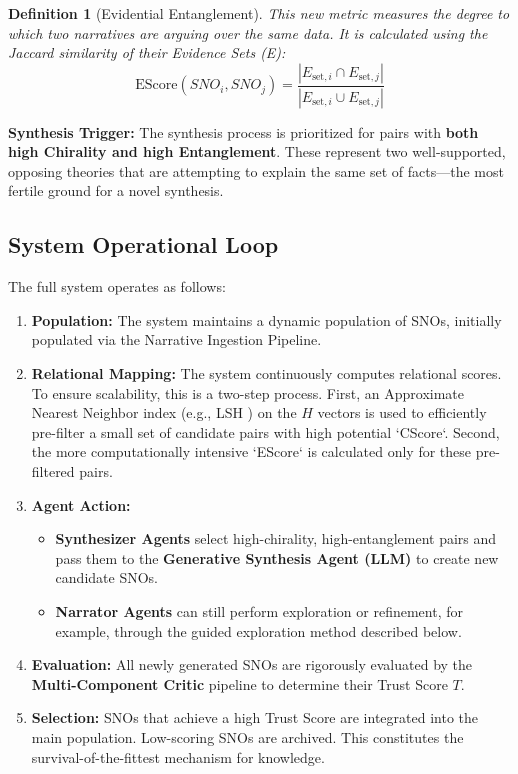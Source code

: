\documentclass[12pt, a4paper]{article}
\newtheorem{definition}{Definition}[section]
\begin{document}
\begin{definition}[Evidential Entanglement]
This new metric measures the degree to which two narratives are arguing over the same data. It is calculated using the Jaccard similarity of their \textit{Evidence Sets (E)}:
\[
\text{EScore}(SNO_i, SNO_j) = \frac{|E_{\text{set}, i} \cap E_{\text{set}, j}|}{|E_{\text{set}, i} \cup E_{\text{set}, j}|}
\]
\end{definition}

\textbf{Synthesis Trigger:} The synthesis process is prioritized for pairs with \textbf{both high Chirality and high Entanglement}. These represent two well-supported, opposing theories that are attempting to explain the same set of facts—the most fertile ground for a novel synthesis.

\subsection{System Operational Loop}
The full system operates as follows:
\begin{enumerate}
    \item \textbf{Population:} The system maintains a dynamic population of SNOs, initially populated via the Narrative Ingestion Pipeline.
    \item \textbf{Relational Mapping:} The system continuously computes relational scores. To ensure scalability, this is a two-step process. First, an Approximate Nearest Neighbor index (e.g., LSH \cite{Indyk1998LSH}) on the $H$ vectors is used to efficiently pre-filter a small set of candidate pairs with high potential `CScore`. Second, the more computationally intensive `EScore` is calculated only for these pre-filtered pairs.
    \item \textbf{Agent Action:}
        \begin{itemize}
            \item \textbf{Synthesizer Agents} select high-chirality, high-entanglement pairs and pass them to the \textbf{Generative Synthesis Agent (LLM)} to create new candidate SNOs.
            \item \textbf{Narrator Agents} can still perform exploration or refinement, for example, through the guided exploration method described below.
        \end{itemize}
    \item \textbf{Evaluation:} All newly generated SNOs are rigorously evaluated by the \textbf{Multi-Component Critic} pipeline to determine their Trust Score $T$.
    \item \textbf{Selection:} SNOs that achieve a high Trust Score are integrated into the main population. Low-scoring SNOs are archived. This constitutes the survival-of-the-fittest mechanism for knowledge.
\end{enumerate}
\end{document}
